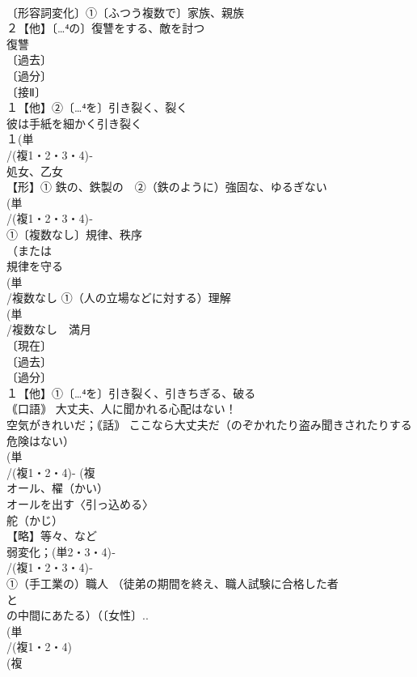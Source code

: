 \documentclass[8pt]{extreport}
\begin{document}
\begin{CJK}{UTF8}{min}
\\	〔形容詞変化〕①〔ふつう複数で〕家族、親族 
\\	２【他】〔…⁴の〕復讐をする、敵を討つ 
\\	復讐
\\	〔過去〕
\\	〔過分〕
\\	〔接Ⅱ〕
\\	１【他】②〔…⁴を〕引き裂く、裂く 
\\	彼は手紙を細かく引き裂く
\\	１(単
\\	/(複1・2・3・4)‐
\\	処女、乙女 
\\	【形】① 鉄の、鉄製の　②（鉄のように）強固な、ゆるぎない
\\	(単
\\	/(複1・2・3・4)‐
\\	①〔複数なし〕規律、秩序 
\\	（または
\\	規律を守る
\\	(単
\\	/複数なし ①（人の立場などに対する）理解
\\	(単
\\	/複数なし　満月 
\\	〔現在〕
\\	〔過去〕
\\	〔過分〕
\\	１【他】①〔…⁴を〕引き裂く、引きちぎる、破る 
\\	｟口語｠ 大丈夫、人に聞かれる心配はない！ 
\\	空気がきれいだ；｟話｠ ここなら大丈夫だ（のぞかれたり盗み聞きされたりする危険はない）
\\	(単
\\	/(複1・2・4)- (複
\\	オール、櫂（かい）　
\\	オールを出す〈引っ込める〉　
\\	舵（かじ）
\\	【略】等々、など 
\\	弱変化；(単2・3・4)‐
\\	/(複1・2・3・4)‐
\\	①（手工業の）職人 （徒弟の期間を終え、職人試験に合格した者
\\	と
\\	の中間にあたる）（〔女性〕..
\\	(単
\\	/(複1・2・4)
\\	(複

\end{CJK}
\end{document}

